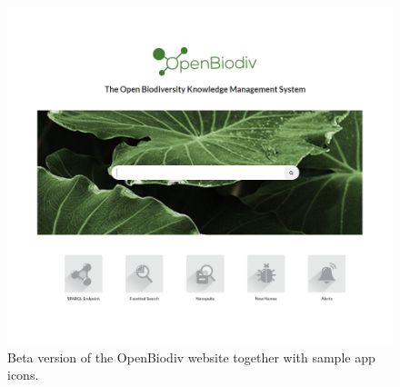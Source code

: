 \begin{figure}
\centering
\includegraphics[width=\textwidth]{Figures/openbiodiv-webpage}
\decoRule
\caption[OpenBiodiv Website]{Beta version of the OpenBiodiv website together with sample app icons.}
\label{fig:website}
\end{figure}


